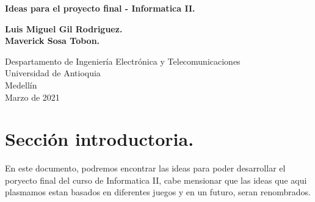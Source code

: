 \documentclass{article}
\begin{document}
\begin{titlepage}
    \begin{center}
        \vspace*{1cm}
            
        \Huge
        \textbf{Ideas para el proyecto final - Informatica II.}
            
        \vspace{0.5cm}
        \LARGE
            
        \vspace{1.5cm}
            
        \textbf{Luis Miguel Gil Rodriguez.}
        \\
        \textbf{Maverick Sosa Tobon.}
            
        \vfill
            
        \vspace{0.8cm}
            
        \Large
        Despartamento de Ingeniería Electrónica y Telecomunicaciones\\
        Universidad de Antioquia\\
        Medellín\\
        Marzo de 2021
            
    \end{center}
\end{titlepage}

\tableofcontents
\newpage
\section{Sección introductoria.}\label{intro}
En este documento, podremos encontrar las ideas para poder desarrollar el poryecto final del curso de Informatica II, cabe mensionar que las ideas que aqui plasmamos estan basados en diferentes juegos y en un futuro, seran renombrados.
\end{document}
